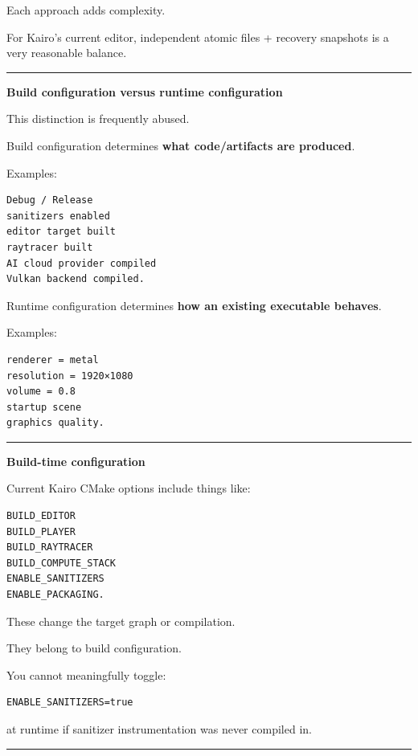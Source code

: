Each approach adds complexity.

For Kairo's current editor, independent atomic files + recovery snapshots is a very reasonable balance.

\begin{center}\rule{0.5\linewidth}{0.5pt}\end{center}

\textbf{Build configuration versus runtime configuration}

This distinction is frequently abused.

Build configuration determines \textbf{what code/artifacts are produced}.

Examples:

\begin{verbatim}
Debug / Release
sanitizers enabled
editor target built
raytracer built
AI cloud provider compiled
Vulkan backend compiled.
\end{verbatim}

Runtime configuration determines \textbf{how an existing executable behaves}.

Examples:

\begin{verbatim}
renderer = metal
resolution = 1920×1080
volume = 0.8
startup scene
graphics quality.
\end{verbatim}

\begin{center}\rule{0.5\linewidth}{0.5pt}\end{center}

\textbf{Build-time configuration}

Current Kairo CMake options include things like:

\begin{verbatim}
BUILD_EDITOR
BUILD_PLAYER
BUILD_RAYTRACER
BUILD_COMPUTE_STACK
ENABLE_SANITIZERS
ENABLE_PACKAGING.
\end{verbatim}

These change the target graph or compilation.

They belong to build configuration.

You cannot meaningfully toggle:

\begin{verbatim}
ENABLE_SANITIZERS=true
\end{verbatim}

at runtime if sanitizer instrumentation was never compiled in.

\begin{center}\rule{0.5\linewidth}{0.5pt}\end{center}

